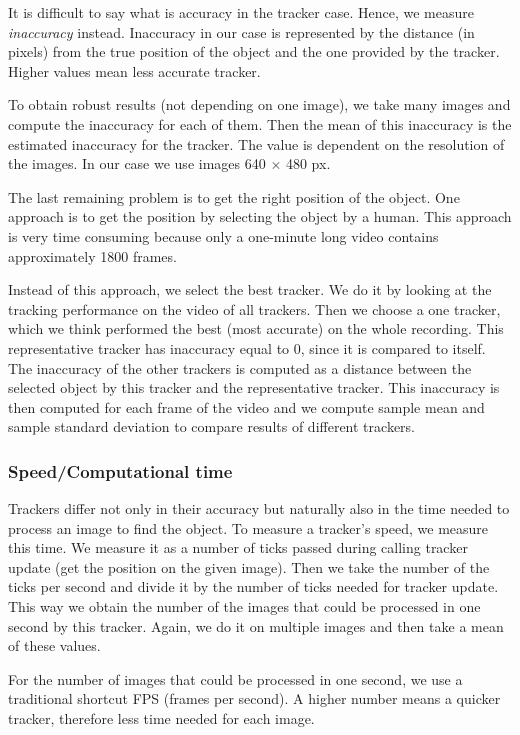 It is difficult to say what is accuracy in the tracker case. Hence, we
measure \emph{inaccuracy} instead. Inaccuracy in our case is represented by the
distance (in pixels) from the true position of the object and the one provided
by the tracker. Higher values mean less accurate tracker.

To obtain robust results (not depending on one image), we take many images and
compute the inaccuracy for each of them. Then the mean of this inaccuracy is
the estimated inaccuracy for the tracker. The value is dependent on the
resolution of the images. In our case we use images 640 $\times$ 480 px.

The last remaining problem is to get the right position of the object. One
approach is to get the position by selecting the object by a human. This
approach is very time consuming because only a one-minute long video contains
approximately 1800 frames.

Instead of this approach, we select the best tracker. We do it by looking at
the tracking performance on the video of all trackers. Then we choose a one
tracker, which we think performed the best (most accurate) on the whole
recording. This representative tracker has inaccuracy equal to 0, since it is
compared to itself.  The inaccuracy of the other trackers is computed as a
distance between the selected object by this tracker and the representative
tracker. This inaccuracy is then computed for each frame of the video and we
compute sample mean and sample standard deviation to compare results of
different trackers.

\subsubsection*{Speed/Computational time}

Trackers differ not only in their accuracy but naturally also in the time
needed to process an image to find the object. To measure a tracker's speed,
we measure this time. We measure it as a number of ticks passed during calling
tracker update (get the position on the given image). Then we take the number
of the ticks per second and divide it by the number of ticks needed for tracker
update. This way we obtain the number of the images that could be processed in
one second by this tracker. Again, we do it on multiple images and then take a mean
of these values.

For the number of images that could be processed in one second, we use a
traditional shortcut FPS (frames per second). A higher number means a quicker
tracker, therefore less time needed for each image.

